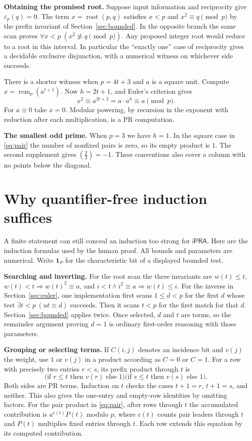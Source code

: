 \documentclass[12pt,letterpaper]{article}
\newcommand{\sect}[1]{\section{\texorpdfstring{\color{accent}#1}{#1}}}
\newcommand{\lab}[1]{\textbf{#1.}\enspace}
\newcommand{\leg}[2]{\left(\frac{#1}{#2}\right)}
\newcommand{\remn}{\operatorname{rem}}
\newcommand{\rootf}{\operatorname{root}}
\newcommand{\sgnbit}{\varepsilon}
\newcommand{\ipra}{\mathsf{iPRA}}
\begin{document}
\lab{Obtaining the promised root} Suppose input information and reciprocity give $\sgnbit_p(q)=0$. The term $x=\rootf(p,q)$ satisfies $x<p$ and $x^2\equiv q\pmod p$ by the prefix invariant of Section~\ref{sec:bounded}. In the opposite branch the same scan proves $\forall x<p\;(x^2\not\equiv q\pmod p)$. Any proposed integer root would reduce to a root in this interval. In particular the ``exactly one'' case of reciprocity gives a decidable exclusive disjunction, with a numerical witness on whichever side succeeds.

There is a shorter witness when $p=4t+3$ and $a$ is a square unit. Compute $x=\remn_p(a^{t+1})$. Now $h=2t+1$, and Euler's criterion gives
\[
                     x^2\equiv a^{2t+2}=a\cdot a^h\equiv a\pmod p.
\]
For $a\equiv0$ take $x=0$. Modular powering, by recursion in the exponent with reduction after each multiplication, is a PR computation.

\lab{The smallest odd prime} When $p=3$ we have $h=1$. In the square case in \eqref{eq:pair} the number of nonfixed pairs is zero, so its empty product is $1$. The second supplement gives $\leg{2}{3}=-1$. These conventions also cover a column with no points below the diagonal.
\clearpage
\sect{Why quantifier-free induction suffices}\label{sec:audit}
A finite statement can still conceal an induction too strong for $\ipra$. Here are the induction formulas used by the human proof. All bounds and parameters are numerical. Write $\mathbf1_{P}$ for the characteristic bit of a displayed bounded test.

\lab{Searching and inverting} For the root scan the three invariants are $w(t)\le t$, $w(t)<t\Rightarrow w(t)^2\equiv a$, and $i<t\land i^2\equiv a\Rightarrow w(t)\le i$. For the inverse in Section~\ref{sec:euler}, one implementation first scans $1\le d<p$ for the first $d$ whose test $\exists t<p\ (ut\equiv d)$ succeeds. Then it scans $t<p$ for the first match for that $d$. Section~\ref{sec:bounded} applies twice. Once selected, $d$ and $t$ are terms, so the remainder argument proving $d=1$ is ordinary first-order reasoning with those parameters.

\lab{Grouping or selecting terms} If $C(i,j)$ denotes an incidence bit and $v(j)$ the weight, use $1$ or $v(j)$ in a product according as $C=0$ or $C=1$. For a row with precisely two entries $r<s$, its prefix product through $t$ is
\[
  \big(\text{if }r\le t\text{ then }v(r)\text{ else }1\big)
  \big(\text{if }s\le t\text{ then }v(s)\text{ else }1\big).
\]
Both sides are PR terms. Induction on $t$ checks the cases $t+1=r$, $t+1=s$, and neither. This also gives the one-entry and empty-row identities by omitting factors. For the pair product in \eqref{eq:pair}, after rows through $t$ the accumulated contribution is $a^{c(t)}P(t)$ modulo $p$, where $c(t)$ counts pair leaders through $t$ and $P(t)$ multiplies fixed entries through $t$. Each row extends this equation by its computed contribution.
\end{document}
